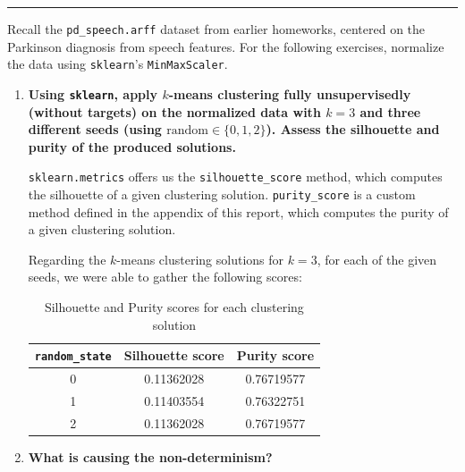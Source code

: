 \documentclass[12pt]{article}
\begin{document}
\hrule \vspace*{0.5cm}

Recall the \texttt{pd\_speech.arff} dataset from earlier homeworks, centered on
the Parkinson diagnosis from speech features. For the following exercises, normalize
the data using \texttt{sklearn}'s \texttt{MinMaxScaler}.

\begin{enumerate}[leftmargin=\labelsep]

  \item \textbf{Using \texttt{sklearn}, apply $k$-means clustering fully unsupervisedly
          (without targets) on the normalized data with $k = 3$ and three different seeds
          (using $\text{random} \in \{0, 1, 2\}$). Assess the silhouette and purity of the produced solutions.}

        \texttt{sklearn.metrics} offers us the \texttt{silhouette\_score} method, which
        computes the silhouette of a given clustering solution.
        \texttt{purity\_score} is a custom method defined in the appendix of this report,
        which computes the purity of a given clustering solution.

        Regarding the $k$-means clustering solutions for $k = 3$, for each of the
        given seeds, we were able to gather the following scores:

        \begin{table}[H]
          \centering
          \begin{tabular}{c|c|c}
            \textbf{\texttt{random\_state}} & \textbf{Silhouette score} & \textbf{Purity score} \\ \hline
            0                               & 0.11362028                & 0.76719577            \\
            1                               & 0.11403554                & 0.76322751            \\
            2                               & 0.11362028                & 0.76719577            \\
          \end{tabular}
          \caption{Silhouette and Purity scores for each clustering solution}
          \label{tab:clustering-solutions-scores}
        \end{table}


  \item \textbf{What is causing the non-determinism?}


\end{enumerate}
\end{document}
